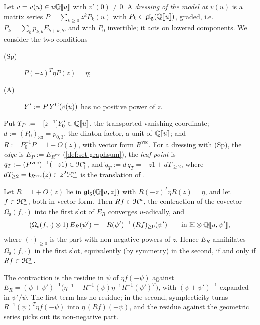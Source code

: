 \begin{defn}
\label{def:tra-dressing}
Let $v=v(u)\in u\mathbb{Q}[\![ u ]\!]$ with $v'(0)\neq0$. A \emph{dressing of the model at $v(u)$} is a matrix series $P=\sum_{k\geq0}z^kP_k(u)$ with $P_k\in\mathfrak{gl}_5(\mathbb{Q}[\![ u ]\!])$, graded, i.e.\ $P_k=\sum_bp_{k,b}E_{b+k,b}$, and with $P_0$ invertible; it acts on lowered components. We consider the two conditions
\begin{description}
\item[(Sp)] $P(-z)^T\eta P(z)=\eta$;
\item[(A)] $Y':=P\,Y^{\mathrm{C}}(v(u))$ has no positive power of $z$.
\end{description}
Put $T_P:=-[z^{-1}]Y'_0\in\mathbb{Q}[\![ u ]\!]$, the transported vanishing coordinate; $d:=(P_0)_{33}=p_{0,3}$, the dilaton factor, a unit of $\mathbb{Q}[\![ u ]\!]$; and $R:=P_0^{-1}P=1+O(z)$, with vector form $R^{\mathrm{vec}}$. For a dressing with (Sp), the \emph{edge} is $E_P:=E_{R^{\mathrm{vec}}}$ (\cref{def:set-graphsum}), the \emph{leaf point} is $q_T:=(P^{\mathrm{vec}})^{-1}(-z1)\in\mathcal{H}^u_+$, and $\tilde q_T:=d\,q_T=-z1+dT_{\geq2}$, where $dT_{\geq2}=\mathfrak{t}_{R^{\mathrm{vec}}}(z)\in z^2\mathcal{H}^u_+$ is the translation of \cite[Def.~2.13]{PPZ15}.
\end{defn}



\begin{lem}
\label{lem:tra-E}
Let $R=1+O(z)$ lie in $\mathfrak{gl}_5(\mathbb{Q}[\![ u,z ]\!])$ with $R(-z)^T\eta R(z)=\eta$, and let $f\in\mathcal{H}^u_-$, both in vector form. Then $Rf\in\mathcal{H}^u$, the contraction of the covector $\Omega_{\mathrm s}(f,\cdot)$ into the first slot of $E_R$ converges $u$-adically, and
\[
(\Omega_{\mathrm s}(f,\cdot)\otimes1)\,E_R(\psi')=-R(\psi')^{-1}\,(Rf)_{\geq0}(\psi')\qquad\text{in }\mathbb{H}\otimes\mathbb{Q}[\![ u,\psi' ]\!] ,
\]
where $(\cdot)_{\geq0}$ is the part with non-negative powers of $z$. Hence $E_R$ annihilates $\Omega_{\mathrm s}(f,\cdot)$ in the first slot, equivalently (by symmetry) in the second, if and only if $Rf\in\mathcal{H}^u_-$.
\end{lem}

\begin{sketch}
The contraction is the residue in $\psi$ of $\eta f(-\psi)$ against $E_R=(\psi+\psi')^{-1}\bigl(\eta^{-1}-R^{-1}(\psi)\eta^{-1}R^{-1}(\psi')^T\bigr)$, with $(\psi+\psi')^{-1}$ expanded in $\psi'/\psi$. The first term has no residue; in the second, symplecticity turns $R^{-1}(\psi)^T\eta f(-\psi)$ into $\eta\,(Rf)(-\psi)$, and the residue against the geometric series picks out its non-negative part.
\end{sketch}

